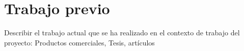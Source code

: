 \section{Trabajo previo}

Describir el trabajo actual que se ha realizado en el contexto de trabajo del proyecto: Productos comerciales, Tesis, artículos